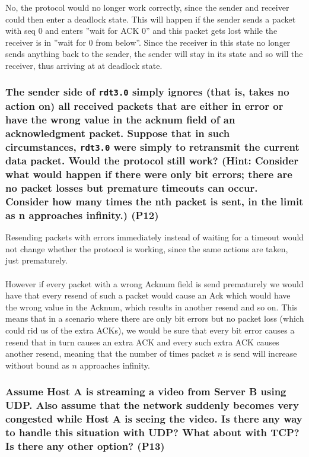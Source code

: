 No, the protocol would no longer work correctly, since the sender and receiver could then enter a deadlock state. This will happen if the sender sends a packet with seq 0 and enters ''wait for ACK 0'' and this packet gets lost while the receiver is in ''wait for 0 from below''. Since the receiver in this state no longer sends anything back to the sender, the sender will stay in its state and so will the receiver, thus arriving at at deadlock state.


\subsubsection{The sender side of \texttt{rdt3.0} simply ignores (that is, takes no action on)  all received packets that are either in error or have the wrong value in the acknum field of an acknowledgment packet. Suppose that in such circumstances, \texttt{rdt3.0} were simply to retransmit the current data packet. Would the protocol still work? (Hint: Consider what would happen if there were only bit errors; there are no packet losses but premature timeouts can occur. Consider how many times the nth packet is sent, in the limit as n approaches infinity.) (P12)}

Resending packets with errors immediately instead of waiting for a timeout would not change whether the protocol is working, since the same actions are taken, just prematurely. \\
\\
However if every packet with a wrong Acknum field is send prematurely we would have that every resend of such a packet would cause an Ack which would have the wrong value in the Acknum, which results in another resend and so on. This means that in a scenario where there are only bit errors but no packet loss (which could rid us of the extra ACKs), we would be sure that every bit error causes a resend that in turn causes an extra ACK and every such extra ACK causes another resend, meaning that the number of times packet $n$ is send will increase without bound as $n$ approaches infinity.


\subsubsection{Assume Host A is streaming a video from Server B using UDP. Also assume that the network suddenly becomes very congested while Host A is seeing the video. Is there any way to handle this situation with UDP? What about with TCP? Is there any other option? (P13)}

